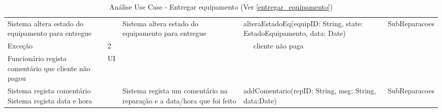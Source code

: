 \documentclass[../relatorio.tex]{subfiles}
\begin{document}
\begin{landscape}
\begin{table}[!h]
\begin{tabular}{|p{5cm}|p{1cm}|p{4cm}|p{6cm}|p{3cm}|}
                    &
                    &
            \\
            \hline
            Sistema altera estado do equipamento para entregue
                    & 
                    & Sistema altera estado do equipamento para entregue
                    & alteraEstadoEq(equipID: String, state: EstadoEquipamento, data: Date)
                    & SubReparacoes
            \\
            \hline
            \rowcolor{red!30}
            Exceção
                     & 
            2 
                     & 
            \multicolumn{3}{c}{cliente não paga}
            \\
            \hline
            \rowcolor{yellow}
            Funcionário regista comentário que cliente não pagou
                    & UI
                    &
                    &
                    &
            \\
            \hline
            Sistema regista comentário
            Sistema regista data e hora
                    & 
                    & Sistema regista um comentário na reparação e a data/hora que foi feito
                    & addComentario(repID: String, msg: String, data:Date)
                    & SubReparacoes
            \\
            \hline
        \end{tabular}
        \caption{Análise Use Case - Entregar equipamento (Ver \ref{entregar_equipamento})}
    \end{table}
\end{landscape}
\end{document}
